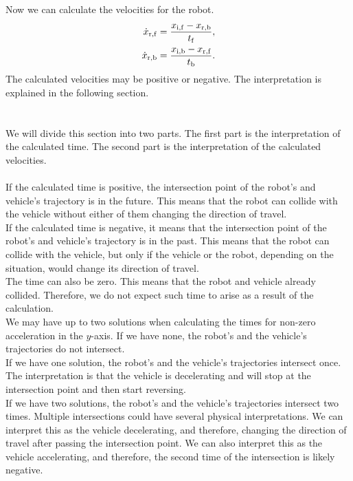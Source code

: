         Now we can calculate the velocities for the robot.
        \begin{align}
            \dot{x}_{\rm{r,f}} &= \frac{x_{\rm{i,f}}-x_{\rm{r,b}}}{t_{\rm{f}}},\\
            \dot{x}_{\rm{r,b}} &= \frac{x_{\rm{i,b}}-x_{\rm{r,f}}}{t_{\rm{b}}}.
        \end{align}
        The calculated velocities may be positive or negative. The interpretation is explained in the following section.\\\\
    \\
        We will divide this section into two parts. The first part is the interpretation of the calculated time. The second part is the interpretation of the calculated velocities.\\\\
        If the calculated time is positive, the intersection point of the robot's and vehicle's trajectory is in the future. This means that the robot can collide with the vehicle without either of them changing the direction of travel.\\
        If the calculated time is negative, it means that the intersection point of the robot's and vehicle's trajectory is in the past. This means that the robot can collide with the vehicle, but only if the vehicle or the robot, depending on the situation, would change its direction of travel.\\
        The time can also be zero. This means that the robot and vehicle already collided. Therefore, we do not expect such time to arise as a result of the calculation.\\
        We may have up to two solutions when calculating the times for non-zero acceleration in the $y$-axis. If we have none, the robot's and the vehicle's trajectories do not intersect.\\
        If we have one solution, the robot's and the vehicle's trajectories intersect once. The interpretation is that the vehicle is decelerating and will stop at the intersection point and then start reversing.\\
        If we have two solutions, the robot's and the vehicle's trajectories intersect two times. Multiple intersections could have several physical interpretations. We can interpret this as the vehicle decelerating, and therefore, changing the direction of travel after passing the intersection point. We can also interpret this as the vehicle accelerating, and therefore, the second time of the intersection is likely negative.\\
